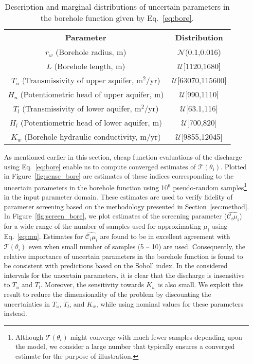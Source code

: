 \begin{table}[htbp]
\renewcommand*{\arraystretch}{1.2}
\begin{center}
\begin{tabular}{|c|c|}
\hline
Parameter & Distribution \\ \hline \hline
$r_w$ (Borehole radius, m) & $\mathcal{N}$(0.1,0.016) \\
$L$ (Borehole length, m) & $\mathcal{U}$[1120,1680] \\
$T_u$ (Transmissivity of upper aquifer, m$^2$/yr) & $\mathcal{U}$[63070,115600] \\
$H_u$ (Potentiometric head of upper aquifer, m) & $\mathcal{U}$[990,1110] \\
$T_l$ (Transmissivity of lower aquifer, m$^2$/yr) & $\mathcal{U}$[63.1,116] \\
$H_l$ (Potentiometric head of lower aquifer, m) & $\mathcal{U}$[700,820] \\
$K_w$ (Borehole hydraulic conductivity, m/yr) & $\mathcal{U}$[9855,12045] \\
\hline
\end{tabular}
\end{center}

\caption{Description and marginal distributions of uncertain parameters in the borehole function
given by Eq.~\ref{eq:bore}.}
\label{tab:bore}
\end{table}

As mentioned earlier in this section, cheap function evaluations of the discharge using 
Eq.~\ref{eq:bore} enable us to compute converged estimates of $\mathcal{T}(\theta_i)$. Plotted in
Figure~\ref{fig:sense_bore} are estimates of these indices corresponding to the uncertain
parameters in the borehole function using 10$^6$ pseudo-random
samples\footnote{Although $\mathcal{T}(\theta_i)$ 
might converge with much fewer samples depending upon the model, we consider a large number that
typically ensures a converged estimate for the purpose of illustration.} in the input parameter domain. 
These estimates are used to verify fidelity of
parameter screening based on the methodology presented in Section~\ref{sec:method}. 
In Figure~\ref{fig:screen_bore}, we plot estimates of the screening parameter ($\hat{\mathcal{C}_i\mu_i}$)
for a wide range of the number of samples used for approximating $\mu_i$ using Eq.~\ref{eq:mu}.
Estimates for $\hat{\mathcal{C}_i\mu_i}$ are found to be in excellent agreement with $\mathcal{T}(\theta_i)$
even when small number of samples (5 -- 10) are used. 
Consequently, the relative importance of uncertain 
parameters in the borehole function is found to be consistent with predictions based on the Sobol' index. 
In the considered intervals for the uncertain parameters, it is clear that the discharge is insensitive to
$T_u$ and $T_l$. Moreover, the sensitivity towards $K_w$ is also small. We exploit this result to reduce
the dimensionality of the problem by 
discounting the uncertainties in $T_u$, $T_l$, and $K_w$, while using nominal values for these
parameters instead.  

